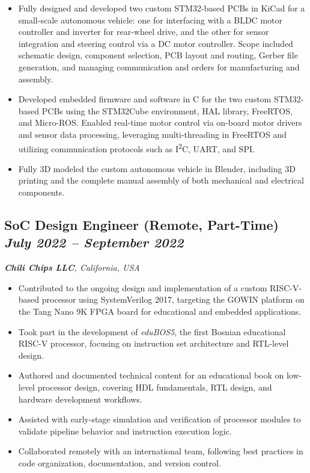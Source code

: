 \begin{itemize}[leftmargin=*,noitemsep,topsep=3pt]
    \item Fully designed and developed two custom STM32-based PCBs in KiCad for a small-scale autonomous vehicle: one for interfacing with a BLDC motor controller and inverter for rear-wheel drive, and the other for sensor integration and steering control via a DC motor controller. Scope included schematic design, component selection, PCB layout and routing, Gerber file generation, and managing communication and orders for manufacturing and assembly.
    \item Developed embedded firmware and software in C for the two custom STM32-based PCBs using the STM32Cube environment, HAL library, FreeRTOS, and Micro-ROS. Enabled real-time motor control via on-board motor drivers and sensor data processing, leveraging multi-threading in FreeRTOS and utilizing communication protocols such as I\textsuperscript{2}C, UART, and SPI.
    \item Fully 3D modeled the custom autonomous vehicle in Blender, including 3D printing and the complete manual assembly of both mechanical and electrical components.
\end{itemize}
\vspace{20pt}


\subsection*{\textbf{SoC Design Engineer (Remote, Part-Time)} \hfill \textit{July 2022 -- September 2022}}  
\noindent\textit{\textbf{Chili Chips LLC}, California, USA} 
\begin{itemize}[leftmargin=*,noitemsep,topsep=3pt]
    \item Contributed to the ongoing design and implementation of a custom RISC-V-based processor using SystemVerilog 2017, targeting the GOWIN platform on the Tang Nano 9K FPGA board for educational and embedded applications.
    \item Took part in the development of \textit{eduBOS5}, the first Bosnian educational RISC-V processor, focusing on instruction set architecture and RTL-level design.
    \item Authored and documented technical content for an educational book on low-level processor design, covering HDL fundamentals, RTL design, and hardware development workflows.
    \item Assisted with early-stage simulation and verification of processor modules to validate pipeline behavior and instruction execution logic.
    \item Collaborated remotely with an international team, following best practices in code organization, documentation, and version control.
\end{itemize}
\vspace{20pt}

